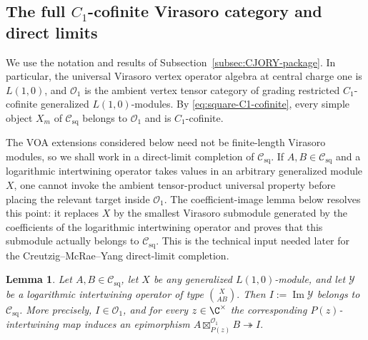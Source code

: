 \documentclass[12pt,leqno]{amsart}
\numberwithin{equation}{section} \newtheorem{thm}{Theorem}[section] \newtheorem{lem}[thm]{Lemma} \newtheorem{ex}[thm]{Example} \newtheorem{prop}[thm]{Proposition} \newtheorem{cor}[thm]{Corollary} \newtheorem{defi}[thm]{Definition} \newtheorem{rmk}[thm]{Remark} \newtheorem{notation}[thm]{Notation}
\newcommand{\Csq}{\mathcal C_{\mathrm{sq}}}
\newcommand{\Ovir}{\mathcal O_1}
\begin{document}
\subsection{The full \texorpdfstring{$C_1$}{C1}-cofinite Virasoro category and direct limits}

We use the notation and results of Subsection~\ref{subsec:CJORY-package}. In particular, the universal Virasoro vertex operator algebra at central charge one is $L(1,0)$, and $\Ovir$ is the ambient vertex tensor category of grading restricted $C_1$-cofinite generalized $L(1,0)$-modules. By \eqref{eq:square-C1-cofinite}, every simple object $X_m$ of $\Csq$ belongs to $\Ovir$ and is $C_1$-cofinite.

The VOA extensions considered below need not be finite-length Virasoro modules, so we shall work in a direct-limit completion of $\Csq$. If $A,B\in\Csq$ and a logarithmic intertwining operator takes values in an arbitrary generalized module $X$, one cannot invoke the ambient tensor-product universal property before placing the relevant target inside $\Ovir$. The coefficient-image lemma below resolves this point: it replaces $X$ by the smallest Virasoro submodule generated by the coefficients of the logarithmic intertwining operator and proves that this submodule actually belongs to $\Csq$. This is the technical input needed later for the Creutzig--McRae--Yang direct-limit completion.

\begin{lem}\label{lem:coeff-image}
Let $A,B\in\Csq$, let $X$ be any generalized $L(1,0)$-module, and let $\mathcal Y$ be a logarithmic intertwining operator of type \(\binom{X}{A B}.\) Then \(I:=\operatorname{Im}\mathcal Y\) belongs to $\Csq$. More precisely, $I\in\Ovir$, and for every $z\in\C^\times$ the corresponding $P(z)$-intertwining map induces an epimorphism \(A\boxtimes^{\Ovir}_{P(z)}B\twoheadrightarrow I.\)
\end{lem}
\end{document}
